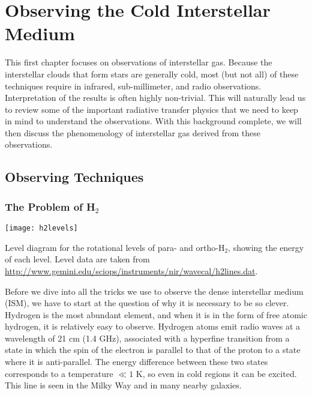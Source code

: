 \chapter{Observing the Cold Interstellar Medium}
\label{ch:obscold}


This first chapter focuses on observations of interstellar gas. Because the interstellar clouds that form stars are generally cold, most (but not all) of these techniques require in infrared, sub-millimeter, and radio observations. Interpretation of the results is often highly non-trivial. This will naturally lead us to review some of the important radiative transfer physics that we need to keep in mind to understand the observations. With this background complete, we will then discuss the phenomenology of interstellar gas derived from these observations.

\section{Observing Techniques}

\subsection{The Problem of H$_2$}

\begin{marginfigure}
\texttt{[image: h2levels]}
\caption[H$_2$ level diagram]{
\label{fig:h2levels}
Level diagram for the rotational levels of para- and ortho-H$_2$, showing the energy of each level. Level data are taken from \url{http://www.gemini.edu/sciops/instruments/nir/wavecal/h2lines.dat}.
}
\end{marginfigure}

Before we dive into all the tricks we use to observe the dense interstellar medium (ISM), we have to start at the question of why it is necessary to be so clever. Hydrogen is the most abundant element, and when it is in the form of free atomic hydrogen, it is relatively easy to observe. Hydrogen atoms emit radio waves at a wavelength of 21 cm (1.4 GHz), associated with a hyperfine transition from a state in which the spin of the electron is parallel to that of the proton to a state where it is anti-parallel. The energy difference between these two states corresponds to a temperature $\ll 1$ K, so even in cold regions it can be excited. This line is seen in the Milky Way and in many nearby galaxies.
  
